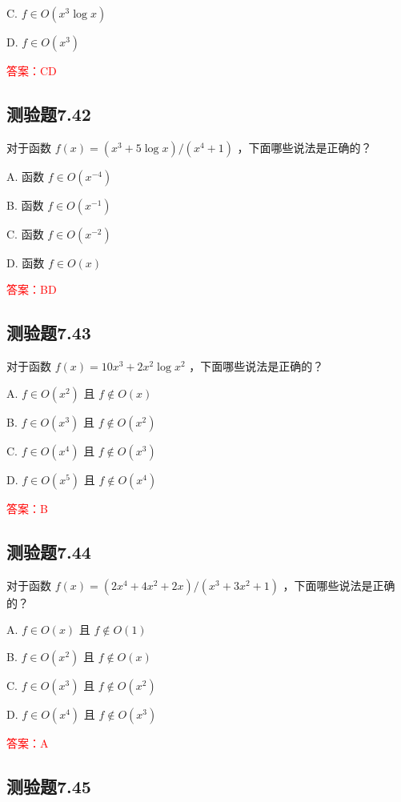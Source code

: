 \documentclass[UTF8, heading=true]{ctexart}
\begin{document}
C. $f \in O\left(x^3 \log x\right)$

D. $ f \in O\left(x^3\right)$

\textcolor{red}{答案：CD}

\subsection{测验题7.42}

对于函数 $f(x)=\left(x^3+5 \log x\right) /\left(x^4+1\right)$ ，下面哪些说法是正确的？

A. 函数 $f \in O\left(x^{-4}\right)$

B. 函数 $f \in O\left(x^{-1}\right)$

C. 函数 $f \in O\left(x^{-2}\right)$

D. 函数 $f \in O(x)$



\textcolor{red}{答案：BD}

\subsection{测验题7.43}

对于函数 $f(x)=10 x^3+2 x^2 \log x^2$ ，下面哪些说法是正确的？

A. $f \in O\left(x^2\right)$ 且 $f \notin O(x)$

B. $f \in O\left(x^3\right)$ 且 $f \notin O\left(x^2\right)$

C. $f \in O\left(x^4\right)$ 且 $f \notin O\left(x^3\right)$

D. $f \in O\left(x^5\right)$ 且 $f \notin O\left(x^4\right)$

\textcolor{red}{答案：B}

\subsection{测验题7.44}

对于函数 $f(x)=\left(2 x^4+4 x^2+2 x\right) /\left(x^3+3 x^2+1\right)$ ，下面哪些说法是正确的？

A. $f \in O(x)$ 且 $f \notin O(1)$

B. $f \in O\left(x^2\right)$ 且 $f \notin O(x)$

C. $f \in O\left(x^3\right)$ 且 $f \notin O\left(x^2\right)$

D. $ f \in O\left(x^4\right)$ 且 $f \notin O\left(x^3\right)$

\textcolor{red}{答案：A}


\subsection{测验题7.45}
\end{document}
